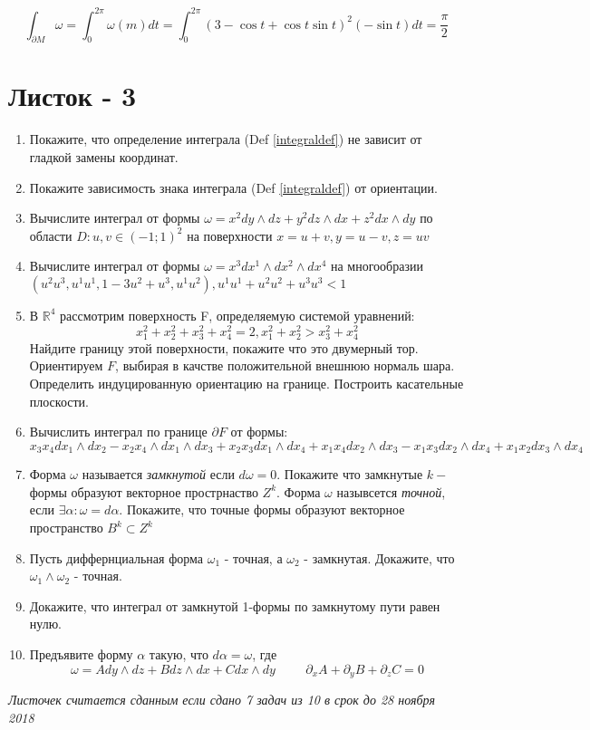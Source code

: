 \documentclass{article}
\begin{document}
 	\begin{equation}
 	\int_{\partial M} \omega = \int_0^{2\pi} \omega(m) dt = \int_0^{2\pi} (3-\cos t + \cos t \sin t)^2 (-\sin t)dt = \frac{\pi}2
 	\end{equation}
 	
 	\newpage
 	{\centering
 		\section*{Листок - 3}}
 	\begin{enumerate}
 		
 		\item Покажите, что определение интеграла (Def \ref{integraldef}) не зависит от гладкой замены координат.
 		\item Покажите зависимость знака интеграла (Def \ref{integraldef}) от ориентации.
 		\item Вычислите интеграл от формы $\omega = x^2 dy \wedge dz + y^2 dz\wedge dx +z^2 dx \wedge dy$ по области $D: u,v \in (-1;1)^2$ на поверхности $x=u+v, y=u-v, z=uv$
 		\item Вычислите интеграл от формы $\omega = x^3 dx^1 \wedge dx^2 \wedge dx^4$ на многообразии $(u^2 u^3, u^1 u^1, 1-3u^2+u^3, u^1 u^2), u^1 u^1 + u^2 u^2 + u^3 u^3 < 1$
 		\item В $\mathbb{R}^4$ рассмотрим поверхность F, определяемую системой уравнений:
 		$$
 		x_1^2+x_2^2+x_3^2+x_4^2=2, x_1^2+x_2^2>x_3^2+x_4^2
 		$$
 		Найдите границу этой поверхности, покажите что это двумерный тор. Ориентируем $F$, выбирая в качстве положительной внешнюю нормаль шара. Определить индуцированную ориентацию на границе. Построить касательные плоскости.
 		\item Вычислить интеграл по границе $\partial F$ от формы:
 		$$x_3 x_4 dx_1\wedge dx_2 - x_2 x_4 \wedge dx_1 \wedge dx_3 + x_2 x_3 dx_1 \wedge dx_4 + x_1 x_4 dx_2 \wedge dx_3 -x_1x_3 dx_2 \wedge dx_4 +x_1 x_2 dx_3 \wedge dx_4$$
 		\item Форма $\omega$ называется \textit{замкнутой} если $d\omega=0$. Покажите что замкнутые $k-$формы образуют векторное прострнаство $Z^k$. Форма $\omega$ назывсется \textit{точной}, если $\exists \alpha: \omega = d \alpha$. Покажите, что точные формы образуют векторное пространство $B^k \subset Z^k$
 		\item Пусть диффернциальная форма $\omega_1$ - точная, а $\omega_2$ - замкнутая. Докажите, что $\omega_1 \wedge \omega_2$ - точная.
 		\item Докажите, что интеграл от замкнутой 1-формы по замкнутому пути равен нулю.
 		\item Предъявите форму $\alpha$ такую, что $d \alpha = \omega$, где
 		$$\omega = A dy \wedge dz + B dz\wedge dx + C dx \wedge dy \hspace{1cm} \partial_x A + \partial_y B + \partial_z C=0$$
 	\end{enumerate}
 	\vspace{\fill}
 	\textit{Листочек считается сданным если сдано 7 задач из 10 в срок до 28 ноября 2018}
 	\newpage
 	
\end{document}
